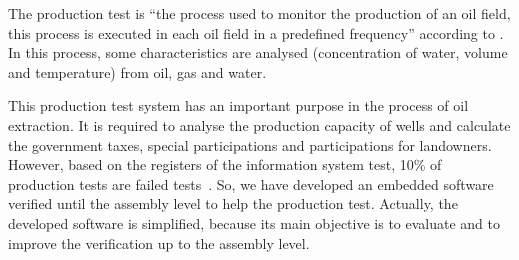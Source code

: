 \documentclass[11pt]{article} %
\begin{document}

The production test is ``the process used to  monitor the production of an oil
field, this process is executed in each oil field in a predefined frequency''
according to \cite{LAUT_SERGIO}. In this process, some characteristics
are analysed (concentration of water, volume and temperature) from oil, gas and
water.



This production test system has an important purpose in the process of oil
extraction. It is required to analyse the production capacity of wells and
calculate the government taxes, special participations and participations for
landowners. However, based on the registers of the information system test,
10\% of production tests are failed tests~\cite{LAUT_SERGIO}. So, we have developed an embedded
software verified until the assembly level to help the production test. Actually,
the developed software is simplified, because its main objective is to evaluate
and to improve the verification up to the assembly level.



\end{document}
